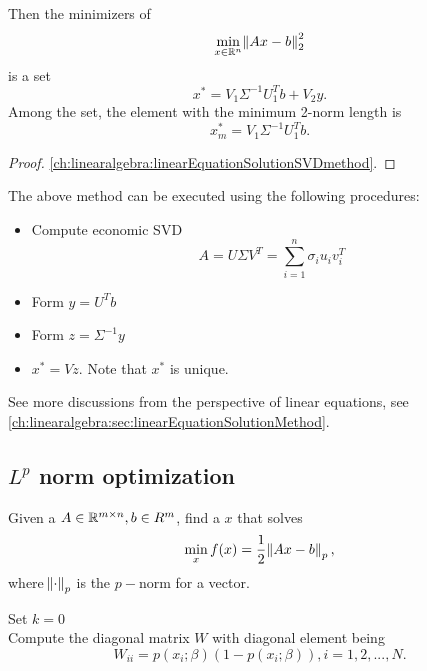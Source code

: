 \begin{refsection}
\begin{lemma}
	Then the minimizers of 
	$$\min_{x\in\mathbb{R}^n} \norm{Ax - b}_2^2$$	
	is a set
	$$x^* = V_1\Sigma^{-1}U_1^T b + V_2y.$$
	Among the set, the element with the minimum 2-norm length is
	$$x^*_m = V_1\Sigma^{-1}U_1^Tb.$$	
\end{lemma}
\begin{proof}
	\autoref{ch:linearalgebra:linearEquationSolutionSVDmethod}.
\end{proof}



\begin{note}[steps]
The above method can be executed using the following procedures:
\begin{itemize}
	\item Compute economic SVD
	$$A = U\Sigma V^T = \sum_{i=1}^n \sigma_i u_i v_i^T$$
	\item Form $y = U^Tb$
	\item Form $z = \Sigma^{-1}y$
	\item $x^* = Vz$. Note that $x^*$ is unique.
\end{itemize}
\end{note}

\begin{remark}
See more discussions from the perspective of linear equations, see \autoref{ch:linearalgebra:sec:linearEquationSolutionMethod}.	
\end{remark}


\subsection{$L^p$ norm optimization}

\begin{definition}
Given a $A\in \mathbb{R}^{m\times n}, b\in R^m$, find a $x$ that solves 
	$$\min_x f(x) = \frac{1}{2}\norm{Ax-b}_p,$$
where $\norm{\cdot}_p$ is the $p-$norm for a vector.	
\end{definition}



\begin{algorithm}[H]
	\SetAlgoLined
	Set $k=0$ \\
	Compute the diagonal matrix $W$ with diagonal element being $$W_{ii} = p(x_i;\beta)(1 - p(x_i;\beta)),i=1,2,...,N.$$
	
\end{algorithm}
\end{refsection}
